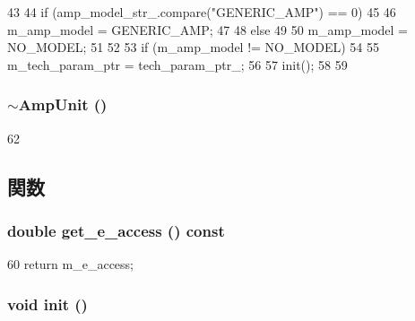 \begin{DoxyCode}
43 {
44     if (amp_model_str_.compare("GENERIC_AMP") == 0)
45     {
46         m_amp_model = GENERIC_AMP;
47     }
48     else
49     {
50         m_amp_model = NO_MODEL;
51     }
52 
53     if (m_amp_model != NO_MODEL)
54     {
55         m_tech_param_ptr = tech_param_ptr_;
56 
57         init();
58     }
59 }
\end{DoxyCode}
\hypertarget{classAmpUnit_a25a24f130a488c02b0d4b6a3a5194bfe}{
\subsubsection[{$\sim$AmpUnit}]{\setlength{\rightskip}{0pt plus 5cm}$\sim${\bf AmpUnit} ()}}
\label{classAmpUnit_a25a24f130a488c02b0d4b6a3a5194bfe}



\begin{DoxyCode}
62 {}
\end{DoxyCode}


\subsection{関数}
\hypertarget{classAmpUnit_a8c117ce84adebfaff93405744dc25fde}{
\subsubsection[{get\_\-e\_\-access}]{\setlength{\rightskip}{0pt plus 5cm}double get\_\-e\_\-access () const}}
\label{classAmpUnit_a8c117ce84adebfaff93405744dc25fde}



\begin{DoxyCode}
60 { return m_e_access; }
\end{DoxyCode}
\hypertarget{classAmpUnit_a02fd73d861ef2e4aabb38c0c9ff82947}{
\subsubsection[{init}]{\setlength{\rightskip}{0pt plus 5cm}void init ()}}
\label{classAmpUnit_a02fd73d861ef2e4aabb38c0c9ff82947}



